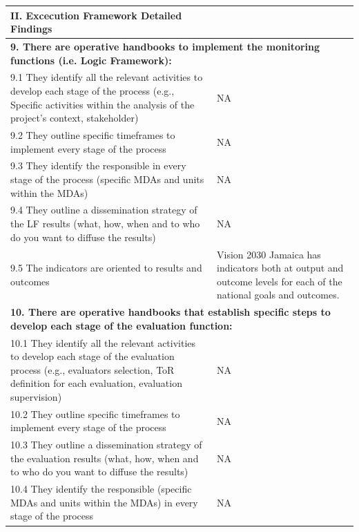\documentclass[
  10pt,
]{book}
\begin{document}
\begin{table}
\centering
\begin{tabular}[t]{l|l}
\hline
II. Excecution Framework Detailed Findings &  \\
\hline
\multicolumn{2}{l}{\textbf{9. There are operative handbooks to implement the monitoring functions (i.e. Logic Framework):}}\\
\hline
\hspace{1em}9.1 They identify all the relevant activities to develop each stage of the process (e.g., Specific activities within the analysis of the project's context, stakeholder) & NA\\
\hline
\hspace{1em}9.2 They outline specific timeframes to implement every stage of the process & NA\\
\hline
\hspace{1em}9.3 They identify the responsible in every stage of the process (specific MDAs and units within the MDAs) & NA\\
\hline
\hspace{1em}9.4 They outline a dissemination strategy of the LF results (what, how, when and to who do you want to diffuse the results) & NA\\
\hline
\hspace{1em}9.5 The indicators are oriented to results and outcomes & Vision 2030 Jamaica has indicators both at output and outcome levels for each of the national goals and outcomes.\\
\hline
\multicolumn{2}{l}{\textbf{10. There are operative handbooks that establish specific steps to develop each stage of the evaluation function:}}\\
\hline
\hspace{1em}10.1 They identify all the relevant activities to develop each stage of the evaluation process (e.g., evaluators selection, ToR definition for each evaluation, evaluation supervision) & NA\\
\hline
\hspace{1em}10.2 They outline specific timeframes to implement every stage of the process & NA\\
\hline
\hspace{1em}10.3 They outline a dissemination strategy of the evaluation results (what, how, when and to who do you want to diffuse the results) & NA\\
\hline
\hspace{1em}10.4 They identify the responsible (specific MDAs and units within the MDAs) in every stage of the process & NA\\

\end{tabular}
\end{table}
\end{document}

